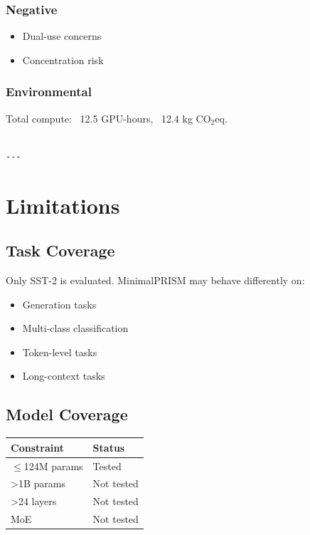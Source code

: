 \subsubsection{Negative}
\begin{itemize}
\item Dual-use concerns
\item Concentration risk

\end{itemize}
\subsubsection{Environmental}
Total compute: ~12.5 GPU-hours, ~12.4 kg CO$_2$eq.
\begin{lstlisting}

---
\end{lstlisting}


\section{Limitations}

\subsection{Task Coverage}

Only SST-2 is evaluated. MinimalPRISM may behave differently on:
\begin{itemize}
\item Generation tasks
\item Multi-class classification
\item Token-level tasks
\item Long-context tasks

\end{itemize}
\subsection{Model Coverage}

\begin{table}[H]
\centering
\small
\begin{tabular}{ll}
\toprule
\textbf{Constraint} & \textbf{Status} \\
\midrule
$\le$124M params & Tested \\
>1B params & Not tested \\
>24 layers & Not tested \\
MoE & Not tested \\
\bottomrule
\end{tabular}
\end{table}

